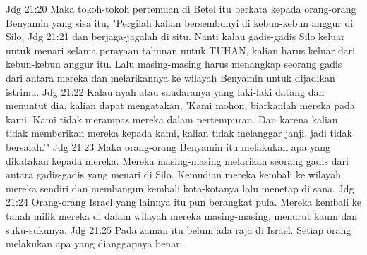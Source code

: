 Jdg 21:20  Maka tokoh-tokoh pertemuan di Betel itu berkata kepada orang-orang Benyamin yang sisa itu, "Pergilah kalian bersembunyi di kebun-kebun anggur di Silo,
Jdg 21:21  dan berjaga-jagalah di situ. Nanti kalau gadis-gadis Silo keluar untuk menari selama perayaan tahunan untuk TUHAN, kalian harus keluar dari kebun-kebun anggur itu. Lalu masing-masing harus menangkap seorang gadis dari antara mereka dan melarikannya ke wilayah Benyamin untuk dijadikan istrimu.
Jdg 21:22  Kalau ayah atau saudaranya yang laki-laki datang dan menuntut dia, kalian dapat mengatakan, 'Kami mohon, biarkanlah mereka pada kami. Kami tidak merampas mereka dalam pertempuran. Dan karena kalian tidak memberikan mereka kepada kami, kalian tidak melanggar janji, jadi tidak bersalah.'"
Jdg 21:23  Maka orang-orang Benyamin itu melakukan apa yang dikatakan kepada mereka. Mereka masing-masing melarikan seorang gadis dari antara gadis-gadis yang menari di Silo. Kemudian mereka kembali ke wilayah mereka sendiri dan membangun kembali kota-kotanya lalu menetap di sana.
Jdg 21:24  Orang-orang Israel yang lainnya itu pun berangkat pula. Mereka kembali ke tanah milik mereka di dalam wilayah mereka masing-masing, menurut kaum dan suku-sukunya.
Jdg 21:25  Pada zaman itu belum ada raja di Israel. Setiap orang melakukan apa yang dianggapnya benar.


